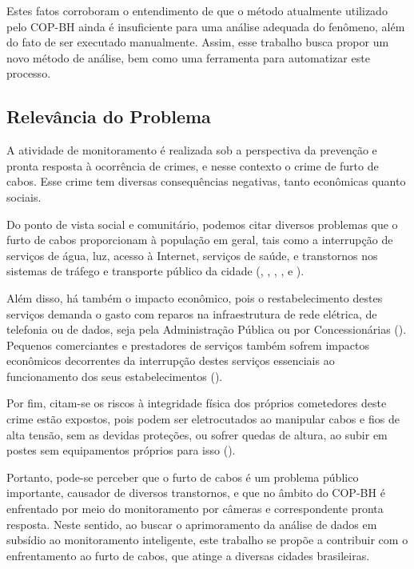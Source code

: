 Estes fatos corroboram o entendimento de que o método atualmente utilizado pelo COP-BH ainda é insuficiente para uma análise adequada do fenômeno, além do fato de ser executado manualmente. Assim, esse trabalho busca propor um novo método de análise, bem como uma ferramenta para automatizar este processo.

\subsection{Relevância do Problema}

A atividade de monitoramento é realizada sob a perspectiva da prevenção e pronta resposta à ocorrência de crimes, e nesse contexto o crime de furto de cabos. Esse crime tem diversas consequências negativas, tanto econômicas quanto sociais.

Do ponto de vista social e comunitário, podemos citar diversos problemas que o furto de cabos proporcionam à população em geral, tais como a interrupção de serviços de água, luz, acesso à Internet, serviços de saúde, e transtornos nos sistemas de tráfego e transporte público da cidade  (, , , ,  e ).

Além disso, há também o impacto econômico, pois o restabelecimento destes serviços demanda o gasto com reparos na infraestrutura de rede elétrica, de telefonia ou de dados, seja pela Administração Pública ou por Concessionárias (). Pequenos comerciantes e prestadores de serviços também sofrem impactos econômicos decorrentes da interrupção destes serviços essenciais ao funcionamento dos seus estabelecimentos ().

Por fim, citam-se os riscos à integridade física dos próprios cometedores deste crime estão expostos, pois podem ser eletrocutados ao manipular cabos e fios de alta tensão, sem as devidas proteções, ou sofrer quedas de altura, ao subir em postes sem equipamentos próprios para isso ().

Portanto, pode-se perceber que o furto de cabos é um problema público importante, causador de diversos transtornos, e que no âmbito do COP-BH é enfrentado por meio do monitoramento por câmeras e correspondente pronta resposta. Neste sentido, ao buscar o aprimoramento da análise de dados em subsídio ao monitoramento inteligente, este trabalho se propõe a contribuir com o enfrentamento ao furto de cabos, que atinge a diversas cidades brasileiras.

